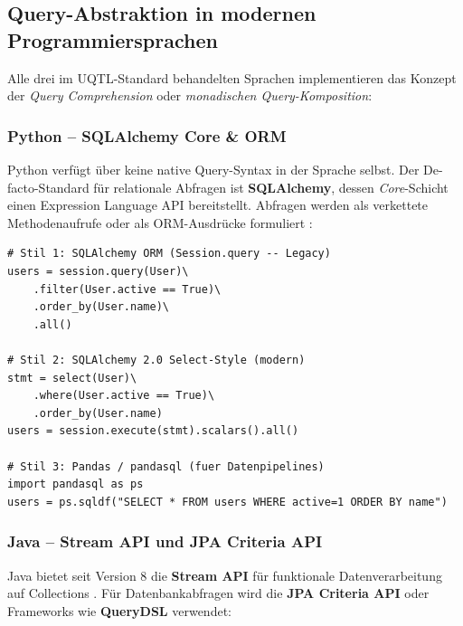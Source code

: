 \subsection{Query-Abstraktion in modernen Programmiersprachen}
\label{subsec:query_abstraktion}

Alle drei im UQTL-Standard behandelten Sprachen implementieren das Konzept der
\emph{Query Comprehension} oder \emph{monadischen Query-Komposition}:

\subsubsection{Python -- SQLAlchemy Core \& ORM}

Python verfügt über keine native Query-Syntax in der Sprache selbst.
Der De-facto-Standard für relationale Abfragen ist \textbf{SQLAlchemy},
dessen \emph{Core}-Schicht einen Expression Language API bereitstellt.
Abfragen werden als verkettete Methodenaufrufe oder als ORM-Ausdrücke
formuliert \cite{sqlalchemy_docs}:

\begin{lstlisting}[style=pythonstyle, caption={Python SQLAlchemy -- Query-Stilarten},
  label=lst:py_styles]
# Stil 1: SQLAlchemy ORM (Session.query -- Legacy)
users = session.query(User)\
    .filter(User.active == True)\
    .order_by(User.name)\
    .all()

# Stil 2: SQLAlchemy 2.0 Select-Style (modern)
stmt = select(User)\
    .where(User.active == True)\
    .order_by(User.name)
users = session.execute(stmt).scalars().all()

# Stil 3: Pandas / pandasql (fuer Datenpipelines)
import pandasql as ps
users = ps.sqldf("SELECT * FROM users WHERE active=1 ORDER BY name")
\end{lstlisting}

\subsubsection{Java -- Stream API und JPA Criteria API}

Java bietet seit Version 8 die \textbf{Stream API} für funktionale
Datenverarbeitung auf Collections \cite{java_stream_docs}. Für
Datenbankabfragen wird die \textbf{JPA Criteria API} oder Frameworks
wie \textbf{QueryDSL} verwendet:

